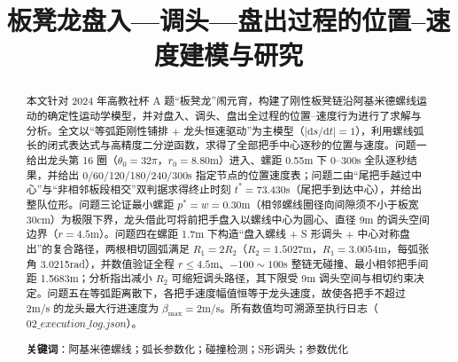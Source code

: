 \documentclass[12pt,a4paper]{article}
\title{\textbf{\LARGE 板凳龙盘入—调头—盘出过程的位置–速度建模与研究}}
\date{}
\begin{document}
\maketitle

\begin{abstract}
本文针对 2024 年高教社杯 A 题“板凳龙”闹元宵，构建了刚性板凳链沿阿基米德螺线运动的确定性运动学模型，并对盘入、调头、盘出全过程的位置–速度行为进行了求解与分析。全文以“等弧距刚性铺排 + 龙头恒速驱动”为主模型（$\lvert\mathrm{d}s/\mathrm{d}t\rvert=1$），利用螺线弧长的闭式表达式与高精度二分逆函数，求得了全部把手中心逐秒的位置与速度。问题一给出龙头第 16 圈（$\theta_0=32\pi$，$r_0=8.80$m）进入、螺距 0.55m 下 0--300s 全队逐秒结果，并给出 0/60/120/180/240/300s 指定节点的位置速度表；问题二由“尾把手越过中心”与“非相邻板段相交”双判据求得终止时刻 $t^{\ast}=73.430$s（尾把手到达中心），并给出整队位形。问题三论证最小螺距 $p^{\ast}=w=0.30$m（相邻螺线圈径向间隙须不小于板宽 30cm）为极限下界，龙头借此可将前把手盘入以螺线中心为圆心、直径 9m 的调头空间边界（$r=4.5$m）。问题四在螺距 1.7m 下构造“盘入螺线 + S 形调头 + 中心对称盘出”的复合路径，两根相切圆弧满足 $R_1=2R_2$（$R_2=1.5027$m，$R_1=3.0054$m，每弧张角 3.0215rad），并数值验证全程 $r\le4.5$m、$-100\sim100$s 整链无碰撞、最小相邻把手间距 1.5683m；分析指出减小 $R_2$ 可缩短调头路径，其下限受 9m 调头空间与相切约束决定。问题五在等弧距离散下，各把手速度幅值恒等于龙头速度，故使各把手不超过 2m/s 的龙头最大行进速度为 $\beta_{\max}=2$m/s。所有数值均可溯源至执行日志（$02\_execution\_log.json$）。

\noindent\textbf{关键词}：阿基米德螺线；弧长参数化；碰撞检测；S形调头；参数优化
\end{abstract}

\newpage









\end{document}
